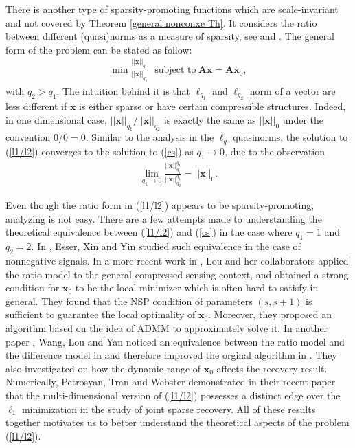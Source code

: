 \documentclass[11pt]{article}
\numberwithin{equation}{section}
\theoremstyle{plain}
\theoremstyle{definition}
\def\A{{\mathbf A}}
\def\x{{\mathbf x}}
\begin{document}
There is another type of sparsity-promoting functions which are scale-invariant and not covered by Theorem \ref{general nonconxe Th}. It considers the ratio between different (quasi)norms as a measure of sparsity, see \cite{hoyer2002non} and \cite{hurley2009comparing}. The general form of the problem can be stated as follow:
\begin{align}
\min \frac{||\x||_{q_1}}{||\x||_{q_2}} \ \ \ \text{subject to}\ \A\x=\A\x_0,\label{l1/l2}
\end{align}
with $q_2>q_1$. The intuition behind it is that $\ell_{q_1}$ and $\ell_{q_2}$ norm of a vector are less different if $\x$ is either sparse or have certain compressible structures. Indeed, in one dimensional case, $||\x||_{q_1}/||\x||_{q_2}$ is exactly the same as $||\x||_0$ under the convention $0/0=0$. Similar to the analysis in the $\ell_q$ quasinorms, the solution to (\ref{l1/l2}) converges to the solution to (\ref{cs}) as $q_1\rightarrow 0$, due to the observation
\begin{align*}
\lim_{q_1\rightarrow 0}\frac{||\x||^{q_1}_{q_1}}{||\x||^{q_1}_{q_2}}=||\x||_0.
\end{align*}

Even though the ratio form in (\ref{l1/l2}) appears to be sparsity-promoting, analyzing is not easy. There are a few attempts made to understanding the theoretical equivalence between (\ref{l1/l2}) and (\ref{cs}) in the case where $q_1=1$ and $q_2=2$. In \cite{yin2014ratio}, Esser, Xin and Yin studied such equivalence in the case of nonnegative signals. In a more recent work in \cite{rahimi2018scale}, Lou and her collaborators applied the ratio model to the general compressed sensing context, and obtained a strong condition for $\x_0$ to be the local minimizer which is often hard to satisfy in general. They found that the NSP condition of parameters $(s, s+1)$ is sufficient to guarantee the local optimality of $\x_0$. Moreover, they proposed an algorithm based on the idea of ADMM to approximately solve it. In another paper \cite{wang2019accelerated}, Wang, Lou and Yan noticed an equivalence between the ratio model and the difference model in \cite{yin2015minimization} and therefore improved the orginal algorithm in \cite{rahimi2018scale}. They also investigated on how the dynamic range of $\x_0$ affects the recovery result. Numerically, Petrosyan, Tran and Webster demonstrated in their recent paper \cite{petrosyan2019reconstruction} that the multi-dimensional version of (\ref{l1/l2}) possesses a distinct edge over the $\ell_1$ minimization in the study of joint sparse recovery. All of these results together motivates us to better understand the theoretical aspects of the problem (\ref{l1/l2}). 
\end{document}
